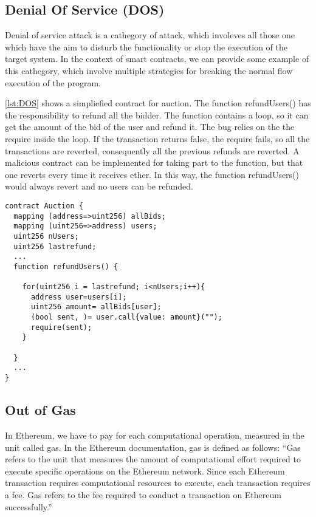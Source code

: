 \documentclass[a4paper,sigconf, language=french,
language=german, language=spanish, language=english]{acmart}
\begin{document}
\subsection{Denial Of Service (DOS)} Denial of service attack is a cathegory of attack, which involeves all those one which have the aim to 
disturb the functionality or stop the execution of the target system. In the context of smart contracts, we can provide some example of this cathegory, 
which involve multiple strategies for breaking the normal flow execution of the program.

\autoref{lst:DOS} shows a simpliefied contract for auction. The function refundUsers() has the responsibility to refund all the bidder. 
The function contains a loop, so it can get the amount of the bid of the user and refund it. The bug relies on the the require inside the loop. If the transaction returns false, 
the require fails, so all the transactions are reverted, consequently all the previous refunds are reverted. A malicious contract can be implemented for taking part to the function, but 
that one reverts every time it receives ether. In this way, the function refundUsers() would always revert and no users can be refunded.

\begin{lstlisting}[language=Solidity,caption={Denial of Service/Out of Gas},label={lst:DOS}]
contract Auction {
  mapping (address=>uint256) allBids;
  mapping (uint256=>address) users;
  uint256 nUsers;
  uint256 lastrefund;
  ... 
  function refundUsers() {
    
    for(uint256 i = lastrefund; i<nUsers;i++){
      address user=users[i];
      uint256 amount= allBids[user];
      (bool sent, )= user.call{value: amount}("");
      require(sent);
    }

  }
  ... 
}
\end{lstlisting}


\subsection{Out of Gas} In Ethereum, we have to pay for each computational operation, measured in the unit called gas. 
In the Ethereum documentation, gas is defined as follows: “Gas refers to the unit that measures the amount of computational effort required to execute specific operations on the Ethereum network. 
Since each Ethereum transaction requires computational resources to execute, each transaction requires a fee. 
Gas refers to the fee required to conduct a transaction on Ethereum successfully.” 
\end{document}
